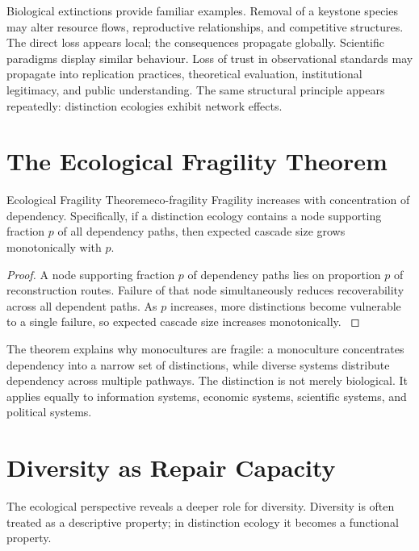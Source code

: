 \documentclass[12pt,twoside,openright]{book}
\begin{document}
Biological extinctions provide familiar examples. Removal
of a keystone species may alter resource flows,
reproductive relationships, and competitive structures. The
direct loss appears local; the consequences propagate
globally. Scientific paradigms display similar behaviour.
Loss of trust in observational standards may propagate into
replication practices, theoretical evaluation, institutional
legitimacy, and public understanding. The same structural
principle appears repeatedly: distinction ecologies exhibit
network effects.

\section{The Ecological Fragility Theorem}
\label{sec:ch12-fragility}

\begin{theorem}{Ecological Fragility Theorem}{eco-fragility}
  Fragility increases with concentration of dependency.
  Specifically, if a distinction ecology contains a node
  supporting fraction $p$ of all dependency paths, then
  expected cascade size grows monotonically with $p$.
\end{theorem}

\begin{proof}
  A node supporting fraction $p$ of dependency paths lies
  on proportion $p$ of reconstruction routes. Failure of
  that node simultaneously reduces recoverability across
  all dependent paths. As $p$ increases, more distinctions
  become vulnerable to a single failure, so expected
  cascade size increases monotonically.
  \parencite{may1973,levin1998}
\end{proof}

The theorem explains why monocultures are fragile: a
monoculture concentrates dependency into a narrow set of
distinctions, while diverse systems distribute dependency
across multiple pathways. The distinction is not merely
biological. It applies equally to information systems,
economic systems, scientific systems, and political
systems.

\section{Diversity as Repair Capacity}
\label{sec:ch12-diversity}

The ecological perspective reveals a deeper role for
diversity. Diversity is often treated as a descriptive
property; in distinction ecology it becomes a functional
property.
\end{document}
